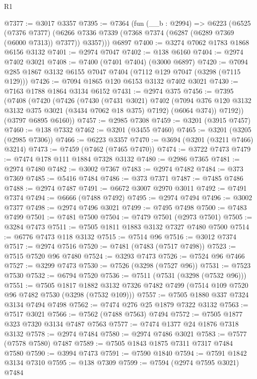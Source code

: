\begin{lexlean}{R1}
\begin{coremodule}
@7377 := @3017 @3357
@7395 := @7364
    (fun (__b : @2994) =>
    @6223
      (@6525
        (@7376 @7377)
        (@6266 @7336 @7339 (@7368 @7374 (@6287 (@6289 @7369 (@6000 @7313)) @7377)) @3357)))
    @6897
@7400 := @3274 @7062 @1783 @1868 @6156 @3132
@7401 := @2974 @7047
@7402 := @138 @6160
@7404 := @2974 @7402 @3021
@7408 := @7400 (@7401 @7404) (@3000 @6897)
@7420 := @7094 @285 @1867 @3132 @6155 @7047 @7404 (@7112 @129 @7047 (@3298 (@7115 @129)))
@7426 := @7094 @1865 @120 @6153 @3132 @7402 @3021
@7430 := @7163 @1788 @1864 @3134 @6152
@7431 := @2974 @375
@7456 := @7395
    (@7408
      (@7420
        (@7426
          (@7430
            (@7431 @3021)
            @7402
            (@7094 @376 @120 @3132 @3132 @375 @3021 (@3434 @7062 @18 @375) @7192)
            (@6064 @374))
          @7192))
      (@3797 @6895 @6160))
@7457 := @2985 @7308
@7459 := @3201 (@3915 @7457)
@7460 := @138 @7332
@7462 := @3201 (@3455 @7460)
@7465 := @3201 (@3205 (@2985 @7306))
@7466 := @6223 @3357
@7470 := @3694 (@3201 (@3211 @7466) @3214)
@7473 := @7459 (@7462 (@7465 @7470))
@7474 := @3722 @7473
@7479 := @7474 @178 @111 @1884 @7328 @3132
@7480 := @2986 @7365
@7481 := @2974 @7480
@7482 := @3002 @7367
@7483 := @2974 @7482
@7484 := @373 @7369
@7485 := @5416 @7484
@7486 := @373 @7371
@7487 := @7485 @7486
@7488 := @2974 @7487
@7491 := @6672 @3007 @2970 @3011
@7492 := @7491 @7374
@7494 := @6666 (@7488 @7492)
@7495 := @2974 @7494
@7496 := @3002 @7377
@7498 := @2974 @7496 @3021
@7499 := @7495 @7498
@7500 := @7483 @7499
@7501 := @7481 @7500
@7504 := @7479 @7501 (@2973 @7501)
@7505 := @3284 @7473
@7511 := @7505 @1811 @1883 @3132 @7327 @7480 @7500
@7514 := @6776 @7473 @118 @3132
@7515 := @7514 @96
@7516 := @3012 @7374
@7517 := @2974 @7516
@7520 := @7481 (@7483 (@7517 @7498))
@7523 := @7515 @7520 @96 @7480
@7524 := @3293 @7473
@7526 := @7524 @96 @7466
@7527 := @3299 @7473
@7530 := @7526 (@3298 (@7527 @96))
@7531 := @7523 @7530
@7532 := @6794 @7520
@7536 := @7511 (@7531 (@3298 (@7532 @96)))
@7551 := @7505
    @1817
    @1882
    @3132
    @7326
    @7482
    @7499
    (@7514 @109 @7520 @96 @7482 @7530 (@3298 (@7532 @109)))
@7557 := @7505 @1880 @337 @7324 @3134 @7494 @7498
@7562 := @7474 @276 @25 @1879 @7322 @3132
@7563 := @7517 @3021
@7566 := @7562 (@7488 @7563) @7494
@7572 := @7505 @1877 @323 @7320 @3134 @7487 @7563
@7577 := @7474 @1377 @24 @1876 @7318 @3132
@7578 := @2974 @7484
@7580 := @2974 @7486 @3021
@7583 := @7577 (@7578 @7580) @7487
@7589 := @7505 @1843 @1875 @7311 @7317 @7484 @7580
@7590 := @3994 @7473
@7591 := @7590 @1840
@7594 := @7591 @1842 @3134 @7310
@7595 := @138 @7309
@7599 := @7594 (@2974 @7595 @3021) @7484

\end{coremodule}
\end{lexlean}
